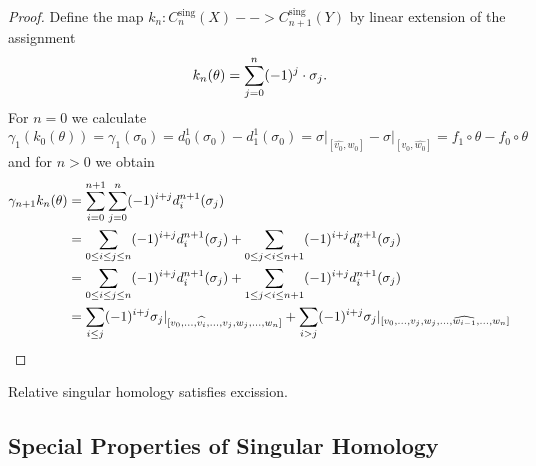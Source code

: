 \begin{proof}
		Define the map $k_n: C_n^\text{sing}(X) --> C_{n+1}^\text{sing}(Y)$ by linear extension of the assignment
		\begin{equation*}
			k_n(\theta) = \sum \limits_{j=0}^n (-1)^j \cdot \sigma_j.
		\end{equation*}
		For $n=0$ we calculate
		\begin{equation*}
			\gamma_1(k_0(\theta)) = \gamma_1(\sigma_0) = d_0^1(\sigma_0) - d_1^1(\sigma_0) = \sigma\vert_{[\widehat{v_0},w_0]} - \sigma\vert_{[v_0,\widehat{w_0}]} = f_1 \circ \theta - f_0 \circ \theta
		\end{equation*}
		and for $n>0$ we obtain
		\begin{align*}
			\gamma_{n+1}k_n(\theta) &= \sum \limits_{i=0}^{n+1}\sum \limits_{j=0}^n (-1)^{i+j} d_i^{n+1}(\sigma_j)\\
			&= \sum \limits_{0 \leq i \leq j \leq n}(-1)^{i+j}d_i^{n+1}(\sigma_j) + \sum \limits_{0 \leq j < i \leq n+1} (-1)^{i+j}d_i^{n+1}(\sigma_j)\\
			&= \sum \limits_{0 \leq i \leq j \leq n}(-1)^{i+j}d_i^{n+1}(\sigma_j) + \sum \limits_{1 \leq j < i \leq n+1} (-1)^{i+j}d_i^{n+1}(\sigma_j)\\
			&= \sum \limits_{i \leq j} (-1)^{i+j}\sigma_j\vert_{[v_0,...,\widehat{v_i},...,v_j,w_j,...,w_n]} + \sum \limits_{i > j}(-1)^{i+j}\sigma_j\vert_{[v_0,...,v_j,w_j,...,\widehat{w_{i-1}},...,w_n]}
		\end{align*}
	\end{proof}

	\begin{theorem}
		Relative singular homology satisfies excission.
	\end{theorem}

	\newpage
	\subsection{Special Properties of Singular Homology}

